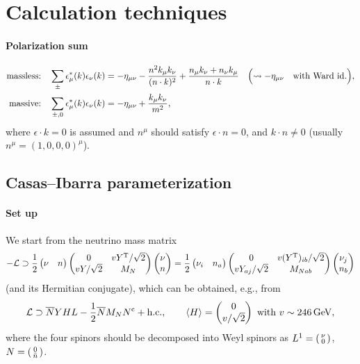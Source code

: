 \documentclass[CheatSheet]{subfiles}
\begin{document}
\summarystyle



\section{Calculation techniques}
\paragraph{Polarization sum}
\begin{alignat}{2}
\text{massless:}\quad
\sum_{\pm}\epsilon^*_\mu(k) \epsilon_\nu(k)
&=
-\eta_{\mu\nu} - \frac{n^2 k_\mu k_\nu}{(n\cdot k)^2} + \frac{n_\mu k_\nu + n_\nu k_\mu}{n\cdot k}
\quad\Bigl(\leadsto -\eta_{\mu\nu}\quad\text{with Ward id.}\Bigr),
\\
\text{massive:}\quad
\sum_{\pm,0}\epsilon^*_\mu(k) \epsilon_\nu(k)
&=
-\eta_{\mu\nu}+\frac{k_\mu k_\nu}{m^2},
\end{alignat}
where $\epsilon\cdot k = 0$ is assumed and $n^\mu$ should satisfy $\epsilon\cdot n=0$, and $k\cdot n\neq 0$ (usually $n^\mu=(1,0,0,0)^\mu$).

\clearpage
\detailstyle

\subsection{Casas--Ibarra parameterization}
\paragraph{Set up}
We start from the neutrino mass matrix
\begin{equation}
-\mathcal L\supset \frac12
 \begin{pmatrix}\nu & n\end{pmatrix} \begin{pmatrix}0 & v Y^{\mathrm{T}}/\sqrt2 \\ v Y/\sqrt2 & M_N\end{pmatrix} \begin{pmatrix}\nu \\ n\end{pmatrix}
= \frac12\begin{pmatrix}\nu_i & n_a\end{pmatrix} \begin{pmatrix}0 & v (Y^{\mathrm{T}})_{ib}/\sqrt2 \\ v Y_{aj}/\sqrt2 & M_{Nab}\end{pmatrix} \begin{pmatrix}\nu_j \\ n_b\end{pmatrix}
\end{equation}
(and its Hermitian conjugate), which can be obtained, e.g., from
\begin{equation}
 \mathcal L \supset \overline{N}Y H L - \frac12\overline{N}M_N N^{\mathrm{c}} + \text{h.c.},
\qquad
\langle H\rangle=\begin{pmatrix}0\\v/\sqrt2\end{pmatrix}\text{~with~}v\sim246\,\mathrm{GeV},
\end{equation}
where the four spinors should be decomposed into Weyl spinors as
$L^1=\left(\begin{smallmatrix}\nu\\0\end{smallmatrix}\right)$,
$N=\left(\begin{smallmatrix}0\\\bar n\end{smallmatrix}\right)$.
\end{document}
